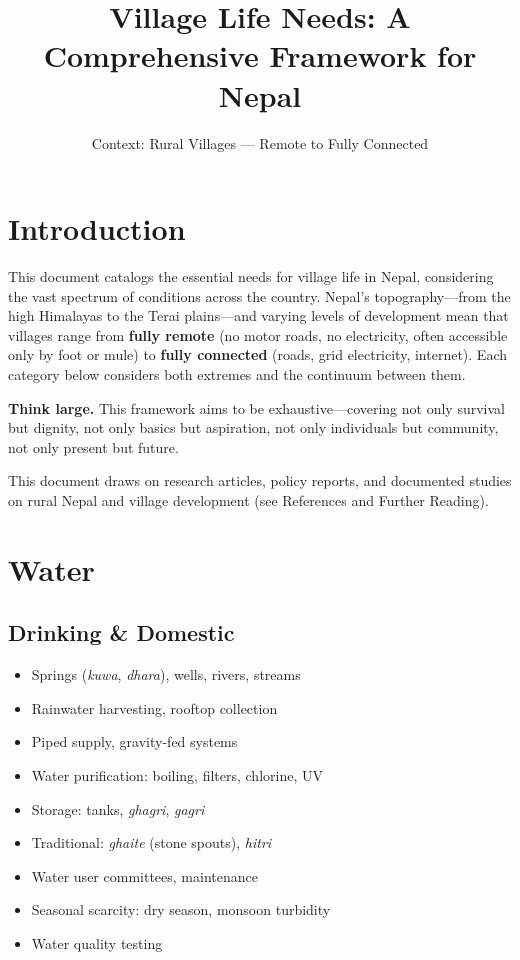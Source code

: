 \documentclass[11pt,a4paper]{article}
\title{Village Life Needs: A Comprehensive Framework for Nepal}
\author{Context: Rural Villages --- Remote to Fully Connected}
\date{}
\begin{document}
\maketitle
\tableofcontents
\newpage

\section{Introduction}

This document catalogs the essential needs for village life in Nepal, considering the vast spectrum of conditions across the country. Nepal's topography---from the high Himalayas to the Terai plains---and varying levels of development mean that villages range from \textbf{fully remote} (no motor roads, no electricity, often accessible only by foot or mule) to \textbf{fully connected} (roads, grid electricity, internet). Each category below considers both extremes and the continuum between them.

\textbf{Think large.} This framework aims to be exhaustive---covering not only survival but dignity, not only basics but aspiration, not only individuals but community, not only present but future.

This document draws on research articles, policy reports, and documented studies on rural Nepal and village development (see References and Further Reading).

\section{Water}

\subsection{Drinking \& Domestic}
\begin{itemize}
    \item Springs (\textit{kuwa}, \textit{dhara}), wells, rivers, streams
    \item Rainwater harvesting, rooftop collection
    \item Piped supply, gravity-fed systems
    \item Water purification: boiling, filters, chlorine, UV
    \item Storage: tanks, \textit{ghagri}, \textit{gagri}
    \item Traditional: \textit{ghaite} (stone spouts), \textit{hitri}
    \item Water user committees, maintenance
    \item Seasonal scarcity: dry season, monsoon turbidity
    \item Water quality testing
\end{itemize}
\end{document}
